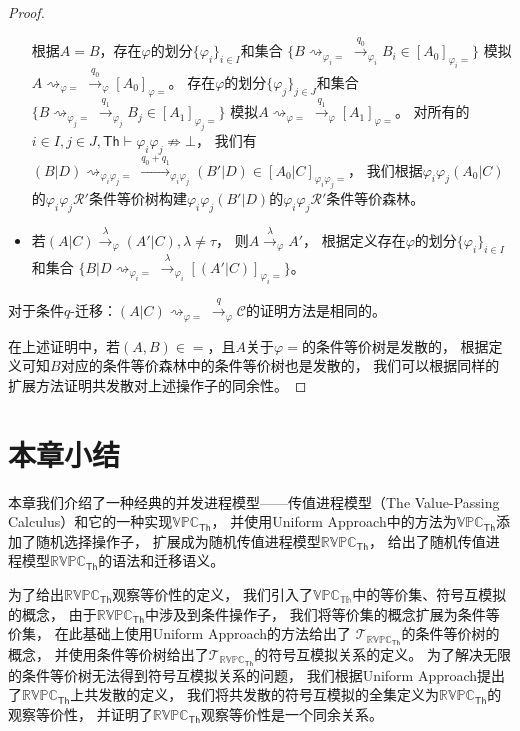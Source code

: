 \begin{proof}
\begin{itemize}
{         根据$A=B$，存在$\varphi$的划分$\{\varphi_i\}_{i\in I}$和集合
         $\{B\rightsquigarrow_{\varphi_i=}\stackrel{q_0}{\rightarrow}_{\varphi_i}B_i\in [A_0]_{\varphi_i =}\}$
         模拟$A\rightsquigarrow_{\varphi = }\stackrel{q_0}{\rightarrow}_{\varphi}[A_0]_{\varphi=}$。
         存在$\varphi$的划分$\{\varphi_j\}_{j\in J}$和集合
         $\{B\rightsquigarrow_{\varphi_j=}\stackrel{q_1}{\rightarrow}_{\varphi_j}B_j\in [A_1]_{\varphi_j =}\}$
         模拟$A\rightsquigarrow_{\varphi = }\stackrel{q_1}{\rightarrow}_{\varphi}[A_1]_{\varphi=}$。
         对所有的$i\in I, j\in J, \mathsf{Th}\vdash \varphi_i\varphi_j\not\Rightarrow \bot$，
         我们有$(B|D)\rightsquigarrow_{\varphi_i\varphi_j=}\stackrel{q_0+q_1}{\longrightarrow}_{\varphi_i\varphi_j}(B'|D)\in[A_0|C]_{\varphi_i\varphi_j=}$，
         我们根据$\varphi_i\varphi_j (A_0|C)$的$\varphi_i\varphi_j \mathcal{R}' $条件等价树构建$\varphi_i\varphi_j(B'|D)$的$\varphi_i\varphi_j \mathcal{R}' $条件等价森林。
      }
      \item {
         若$(A|C)\stackrel{\lambda}{\rightarrow}_{\varphi} (A'|C), \lambda\neq \tau$，
         则$A\stackrel{\lambda}{\rightarrow}_{\varphi} A'$，
         根据定义存在$\varphi$的划分$\{\varphi_i\}_{i\in I}$和集合
         $\{B|D\rightsquigarrow_{\varphi_i=}\stackrel{\lambda}{\rightarrow}_{\varphi_i} [(A'|C)]_{\varphi_i=}\}$。
      }
   \end{itemize}
   对于条件$q$-迁移：$(A|C)\rightsquigarrow_{\varphi=}\stackrel{q}{\rightarrow}_{\varphi}\mathcal{C}$的证明方法是相同的。

   在上述证明中，若$(A,B)\in =$，且$A$关于$\varphi =$的条件等价树是发散的，
   根据定义可知$B$对应的条件等价森林中的条件等价树也是发散的，
   我们可以根据同样的扩展方法证明共发散对上述操作子的同余性。
\end{proof}

\section{本章小结}
本章我们介绍了一种经典的并发进程模型——传值进程模型（The Value-Passing Calculus）和它的一种实现$\mathbb{VPC}_{\mathsf{Th}}$，
并使用Uniform Approach中的方法为$\mathbb{VPC}_{\mathsf{Th}}$添加了随机选择操作子，
扩展成为随机传值进程模型$\mathbb{RVPC}_{\mathsf{Th}}$，
给出了随机传值进程模型$\mathbb{RVPC}_{\mathsf{Th}}$的语法和迁移语义。

为了给出$\mathbb{RVPC}_{\mathsf{Th}}$观察等价性的定义，
我们引入了$\mathbb{VPC}_{\mathbb{Th}}$中的等价集、符号互模拟的概念，
由于$\mathbb{RVPC}_{\mathsf{Th}}$中涉及到条件操作子，
我们将等价集的概念扩展为条件等价集，
在此基础上使用Uniform Approach的方法给出了
$\mathcal{T}_{\mathbb{RVPC}_{\mathsf{Th}}}$的条件等价树的概念，
并使用条件等价树给出了$\mathcal{T}_{\mathbb{RVPC}_{\mathsf{Th}}}$的符号互模拟关系的定义。
为了解决无限的条件等价树无法得到符号互模拟关系的问题，
我们根据Uniform Approach提出了$\mathbb{RVPC}_{\mathsf{Th}}$上共发散的定义，
我们将共发散的符号互模拟的全集定义为$\mathbb{RVPC}_{\mathsf{Th}}$的观察等价性，
并证明了$\mathbb{RVPC}_{\mathsf{Th}}$观察等价性是一个同余关系。
\clearpage
\phantom{s}
\clearpage